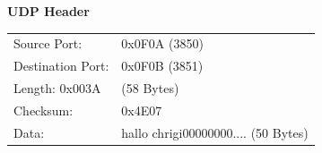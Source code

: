 \textbf{UDP Header}\\
\begin{tabular}[h]{ll}
Source Port: & 0x0F0A (3850)\\
Destination Port: & 0x0F0B (3851)\\
Length: 0x003A & (58 Bytes)\\
Checksum: & 0x4E07\\
Data: & hallo chrigi00000000.... (50 Bytes)
\end{tabular}


